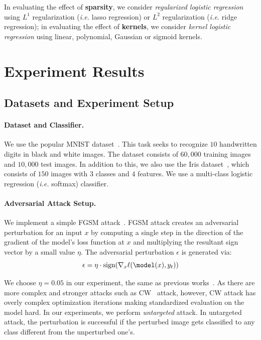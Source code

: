 \documentclass{article}
\begin{document}
In evaluating the effect of \textbf{sparsity}, we consider \textit{regularized logistic regression} using $L^{1}$ regularization (\textit{i.e.} lasso regression) or $L^{2}$ regularization (\textit{i.e.} ridge regression); in evaluating the effect of \textbf{kernels}, we consider \textit{kernel logistic regression} using linear, polynomial, Gaussian or sigmoid kernels.



\section{Experiment Results}
\subsection{Datasets and Experiment Setup}
  
\paragraph{Dataset and Classifier. } We use the popular MNIST dataset~\cite{lecun1995mnist}. This task seeks to recognize $10$ handwritten digits in black and white images. The dataset consists of $60,000$ training images and $10,000$ test images. In addition to this, we also use the Iris dataset~\cite{fisher1936uci}, which consists of $150$ images with $3$ classes and $4$ features. We use a multi-class logistic regression (\textit{i.e.} softmax) classifier.

\paragraph{Adversarial Attack Setup. } We implement a simple FGSM attack~\cite{goodfellow2014explaining}. FGSM attack creates an adversarial perturbation for an input $x$ by computing a single step in the direction of the gradient of the model's loss function at $x$ and multiplying the resultant sign vector by a small value $\eta$. The adversarial perturbation $\epsilon$ is generated via:
\begin{equation}
    \epsilon = \eta \cdot \text{sign}(\nabla_x \ell(\model(x), y_t))
\end{equation}

We choose $\eta = 0.05$ in our experiment, the same as previous works~\cite{shan2020gotta,xu2017feature}. As there are more complex and stronger attacks such as CW~\cite{cwattack} attack, however, CW attack has overly complex optimization iterations making standardized evaluation on the model hard. In our experiments, we perform \textit{untargeted} attack. In untargeted attack, the perturbation is successful if the perturbed image gets classified to any class different from the unperturbed one's. 
\end{document}
